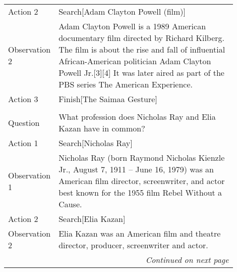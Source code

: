 \begin{table}[H]
\begin{minipage}{0.9\linewidth}
\begin{tabular}{l p{0.9\linewidth}}
Action 2 &  Search[Adam Clayton Powell (film)]\\
Observation 2 &  Adam Clayton Powell is a 1989 American documentary film directed by Richard Kilberg. The film is about the rise and fall of influential African-American politician Adam Clayton Powell Jr.[3][4] It was later aired as part of the PBS series The American Experience.\\
Action 3 &  Finish[The Saimaa Gesture]\\
\\
Question &  What profession does Nicholas Ray and Elia Kazan have in common?\\
Action 1 &  Search[Nicholas Ray]\\
Observation 1 &  Nicholas Ray (born Raymond Nicholas Kienzle Jr., August 7, 1911 – June 16, 1979) was an American film director, screenwriter, and actor best known for the 1955 film Rebel Without a Cause.\\
Action 2 &  Search[Elia Kazan]\\
Observation 2 &  Elia Kazan was an American film and theatre director, producer, screenwriter and actor.\\


\midrule \multicolumn{2}{r}{\textit{Continued on next page}} \\
\end{tabular}
\end{minipage}%
\end{table}


